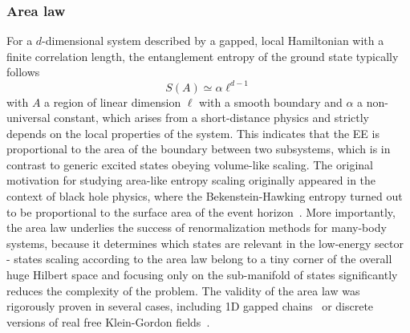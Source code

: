 \subsubsection{Area law}
For a $d$-dimensional system described by a gapped, local Hamiltonian with a finite correlation length, the entanglement entropy of the ground state typically follows~\cite{RevModPhys.82.277}
\begin{equation}
S (A) \simeq \alpha  \ell^{d -1 }
\label{eq:area_law}
\end{equation}
with $A$ a region of linear dimension $\ell$ with a smooth boundary and $\alpha$ a non-universal constant, which arises from a short-distance physics and strictly depends on the local properties of the system. This indicates that the EE is proportional to the area of the boundary between two subsystems, which is in contrast to generic excited states obeying volume-like scaling. The original motivation for studying area-like entropy scaling originally appeared in the context of black hole physics, where the Bekenstein-Hawking entropy turned out to be proportional to the surface area of the event horizon~\cite{PhysRevD.7.2333}. More importantly, the area law underlies the success of renormalization methods for many-body systems, because it determines which states are relevant in the low-energy sector - states scaling according to the area law belong to a tiny corner of the overall huge Hilbert space and focusing only on the sub-manifold of states significantly reduces the complexity of the problem. The validity of the area law was rigorously proven in several cases, including 1D gapped chains~\cite{Hastings_2007} or discrete versions of real free Klein-Gordon fields~\cite{PhysRevLett.94.060503}.


